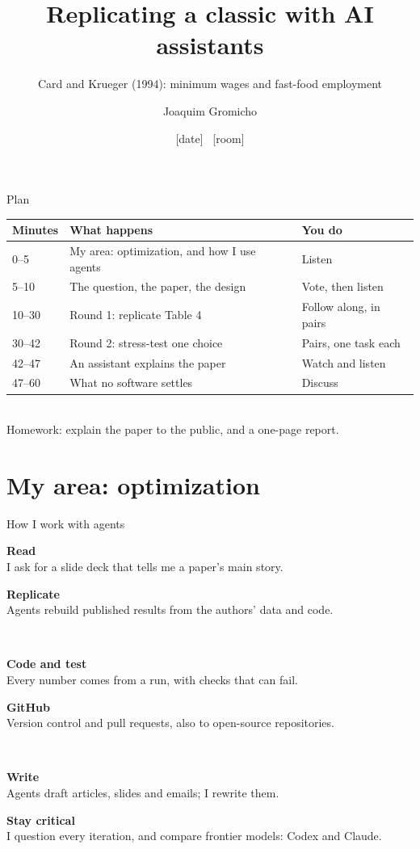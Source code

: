 \documentclass[aspectratio=169,11pt]{beamer}
\title{Replicating a classic with AI assistants}
\subtitle{Card and Krueger (1994): minimum wages and fast-food employment}
\author{Joaquim Gromicho}
\institute{AI \& Research \textperiodcentered\ Lab 4, evening 3 \textperiodcentered\ 60 minutes, follow along in pairs}
\date{[date] \textperiodcentered\ [room]}
\newcommand{\habit}[3]{\begin{minipage}[t]{0.47\textwidth}{\color{accent}\large #1}\hspace{0.5em}\textbf{#2}\\[0.1em]{\small #3}\end{minipage}}
\begin{document}
\maketitle
{}

\begin{frame}{Plan}
\begin{tabular}{@{}p{}p{}p{}@{}}
\toprule
\textbf{Minutes} & \textbf{What happens} & \textbf{You do}\\
\midrule
0--5 & My area: optimization, and how I use agents & Listen\\
5--10 & The question, the paper, the design & Vote, then listen\\
10--30 & \alert{Round 1:} replicate Table 4 & Follow along, in pairs\\
30--42 & \alert{Round 2:} stress-test one choice & Pairs, one task each\\
42--47 & An assistant explains the paper & Watch and listen\\
47--60 & What no software settles & Discuss\\
\bottomrule
\end{tabular}\\[0.5em]
\small Homework: explain the paper to the public, and a one-page report.
\end{frame}

\section{My area: optimization}

\begin{frame}{How I work with agents}
\habit{\faBookOpen}{Read}{I ask for a slide deck that tells me a paper's main story.}\hfill
\habit{\faRedo}{Replicate}{Agents rebuild published results from the authors' data and code.}\\[1em]
\habit{\faVial}{Code and test}{Every number comes from a run, with checks that can fail.}\hfill
\habit{\faCodeBranch}{GitHub}{Version control and pull requests, also to open-source repositories.}\\[1em]
\habit{\faPen}{Write}{Agents draft articles, slides and emails; I rewrite them.}\hfill
\habit{\faBalanceScale}{Stay critical}{I question every iteration, and compare frontier models: Codex and Claude.}
\end{frame}
\end{document}
